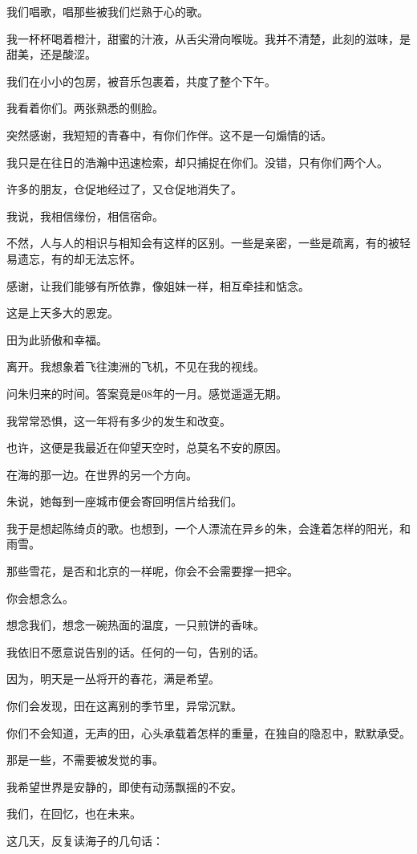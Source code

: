 		\vspace{1em}
		我们唱歌，唱那些被我们烂熟于心的歌。\par
		我一杯杯喝着橙汁，甜蜜的汁液，从舌尖滑向喉咙。我并不清楚，此刻的滋味，是甜美，还是酸涩。\par
		我们在小小的包房，被音乐包裹着，共度了整个下午。\par
		我看着你们。两张熟悉的侧脸。\par
		突然感谢，我短短的青春中，有你们作伴。这不是一句煽情的话。\par
		我只是在往日的浩瀚中迅速检索，却只捕捉在你们。没错，只有你们两个人。\par
		许多的朋友，仓促地经过了，又仓促地消失了。\par
		我说，我相信缘份，相信宿命。\par
		不然，人与人的相识与相知会有这样的区别。一些是亲密，一些是疏离，有的被轻易遗忘，有的却无法忘怀。\par
		感谢，让我们能够有所依靠，像姐妹一样，相互牵挂和惦念。\par
		这是上天多大的恩宠。\par
		田为此骄傲和幸福。

		\vspace{1em}
		离开。我想象着飞往澳洲的飞机，不见在我的视线。\par
		问朱归来的时间。答案竟是08年的一月。感觉遥遥无期。\par
		我常常恐惧，这一年将有多少的发生和改变。\par
		也许，这便是我最近在仰望天空时，总莫名不安的原因。\par
		在海的那一边。在世界的另一个方向。\par
		朱说，她每到一座城市便会寄回明信片给我们。\par
		我于是想起陈绮贞的歌。也想到，一个人漂流在异乡的朱，会逢着怎样的阳光，和雨雪。\par
		那些雪花，是否和北京的一样呢，你会不会需要撑一把伞。\par
		你会想念么。\par
		想念我们，想念一碗热面的温度，一只煎饼的香味。

		\vspace{1em}
		我依旧不愿意说告别的话。任何的一句，告别的话。\par
		因为，明天是一丛将开的春花，满是希望。\par
		你们会发现，田在这离别的季节里，异常沉默。\par
		你们不会知道，无声的田，心头承载着怎样的重量，在独自的隐忍中，默默承受。\par
		那是一些，不需要被发觉的事。\par
		我希望世界是安静的，即使有动荡飘摇的不安。\par
		我们，在回忆，也在未来。\par
		这几天，反复读海子的几句话：


